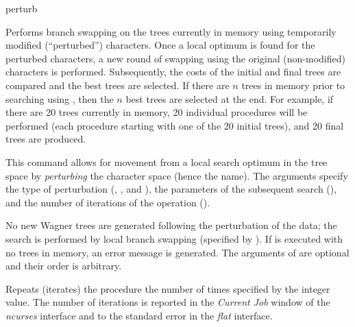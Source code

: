 \begin{command}{perturb}{}


\begin{poydescription} 
Performs branch swapping on the trees currently in memory using 
temporarily modified (``perturbed'') characters. Once a local optimum is
found for the perturbed characters, a new round of swapping using the
original (non-modified) characters is performed. Subsequently, the costs
of the initial and final trees are compared and the best trees are
selected. If there are $n$ trees in memory prior to searching using
, then the $n$ best trees are selected at the end.
For example, if there are 20 trees currently in memory, 20 individual
 procedures will be performed (each procedure
starting with one of the 20 initial trees), and 20 final trees are
produced.

This command allows for movement from a local search optimum in the tree
space by \emph{perturbing} the character space (hence the name). The
arguments specify the type of perturbation (,
, and ), the parameters of
the subsequent search (), and the number of iterations
of the  operation ().

No new Wagner trees are generated following the perturbation of the
data; the search is performed by local branch swapping (specified by
). If  is executed with no
trees in memory, an error message is generated. The arguments of
 are optional and their order is arbitrary. 
\end{poydescription}

\begin{arguments}

{Repeats (iterates) the  procedure the
number of times specified by the integer value. The number of
iterations is reported in the \emph{Current Job} window of the
\emph{ncurses} interface and to the standard error in the \emph{flat} 
interface.}
{}


\end{arguments}
\end{command}
